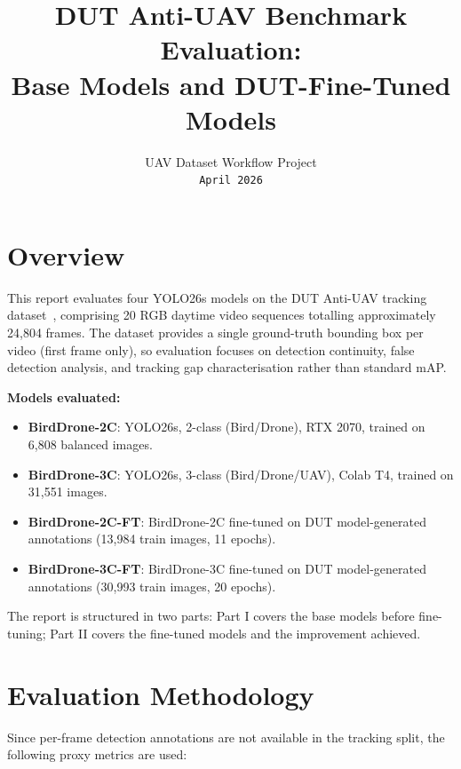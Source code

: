 \documentclass[11pt]{article}
\title{\textbf{DUT Anti-UAV Benchmark Evaluation:\\
Base Models and DUT-Fine-Tuned Models}}
\author{UAV Dataset Workflow Project \\ \texttt{April 2026}}
\date{}
\begin{document}
\maketitle
\tableofcontents
\newpage

\section{Overview}

This report evaluates four YOLO26s models on the DUT Anti-UAV tracking
dataset~\cite{dutantiuav2022}, comprising 20 RGB daytime video sequences
totalling approximately 24{,}804 frames. The dataset provides a single
ground-truth bounding box per video (first frame only), so evaluation
focuses on detection continuity, false detection analysis, and tracking
gap characterisation rather than standard mAP.

\textbf{Models evaluated:}
\begin{itemize}
  \item \textbf{BirdDrone-2C}: YOLO26s, 2-class (Bird/Drone), RTX 2070,
        trained on 6{,}808 balanced images.
  \item \textbf{BirdDrone-3C}: YOLO26s, 3-class (Bird/Drone/UAV), Colab T4,
        trained on 31{,}551 images.
  \item \textbf{BirdDrone-2C-FT}: BirdDrone-2C fine-tuned on DUT model-generated annotations
        (13,984 train images, 11 epochs).
  \item \textbf{BirdDrone-3C-FT}: BirdDrone-3C fine-tuned on DUT model-generated annotations
        (30,993 train images, 20 epochs).
\end{itemize}

The report is structured in two parts: Part I covers the base models before
fine-tuning; Part II covers the fine-tuned models and the improvement achieved.

\section{Evaluation Methodology}

Since per-frame detection annotations are not available in the tracking
split, the following proxy metrics are used:
\end{document}
